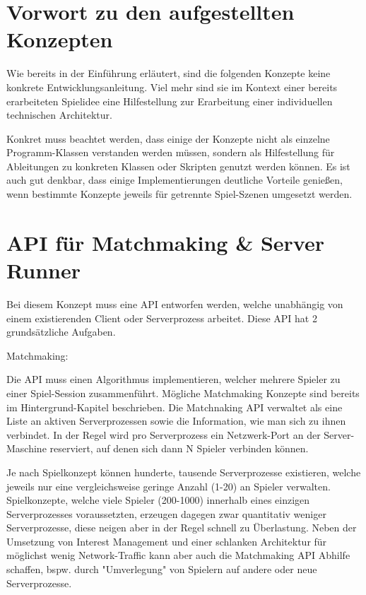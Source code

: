 \cite{MFatihMAR.2021}

\section{Vorwort zu den aufgestellten Konzepten}

Wie bereits in der Einführung erläutert, sind die folgenden Konzepte keine konkrete Entwicklungsanleitung. Viel mehr sind sie im Kontext einer bereits erarbeiteten Spielidee eine Hilfestellung zur Erarbeitung einer individuellen technischen Architektur.

Konkret muss beachtet werden, dass einige der Konzepte nicht als einzelne Programm-Klassen verstanden werden müssen, sondern als Hilfestellung für Ableitungen zu konkreten Klassen oder Skripten genutzt werden können. Es ist auch gut denkbar, dass einige Implementierungen deutliche Vorteile genießen, wenn bestimmte Konzepte jeweils für getrennte Spiel-Szenen \cite{Wikipedia.2012} umgesetzt werden.

\section{API für Matchmaking \& Server Runner}

Bei diesem Konzept muss eine API entworfen werden, welche unabhängig von einem existierenden Client oder Serverprozess arbeitet. Diese API hat 2 grundsätzliche Aufgaben. 

Matchmaking:

Die API muss einen Algorithmus implementieren, welcher mehrere Spieler zu einer Spiel-Session zusammenführt. Mögliche Matchmaking Konzepte sind bereits im Hintergrund-Kapitel beschrieben. Die Matchnaking API verwaltet als eine Liste an aktiven Serverprozessen sowie die Information, wie man sich zu ihnen verbindet. In der Regel wird pro Serverprozess ein Netzwerk-Port an der Server-Maschine reserviert, auf denen sich dann N Spieler verbinden können.

Je nach Spielkonzept können hunderte, tausende Serverprozesse existieren, welche jeweils nur eine vergleichsweise geringe Anzahl (1-20) an Spieler verwalten. Spielkonzepte, welche viele Spieler (200-1000) innerhalb eines einzigen Serverprozesses voraussetzten, erzeugen dagegen zwar quantitativ weniger Serverprozesse, diese neigen aber in der Regel schnell zu Überlastung. Neben der Umsetzung von Interest Management und einer schlanken Architektur für möglichst wenig Network-Traffic kann aber auch die Matchmaking API Abhilfe schaffen, bspw. durch "Umverlegung" von Spielern auf andere oder neue Serverprozesse.

